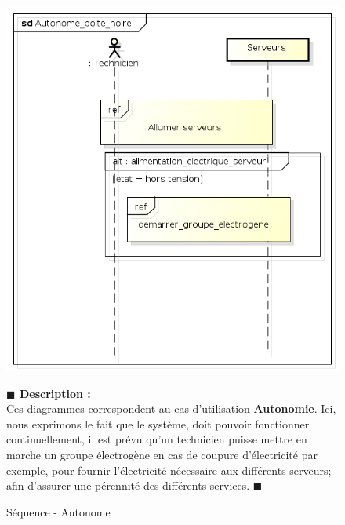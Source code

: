 \documentclass[11pt, titlepage]{report}
\newcommand{\debutDescription}{\noindent\textbf{\textcolor{DescriptionColor}{$\blacksquare$  Description : \\}}}
\newcommand{\finDescription}{\noindent\textcolor{DescriptionColor}{$\blacksquare$}}
\begin{document}
\begin{figure}[h!]
\begin{center}
\includegraphics[scale=.4]{../images/diagrammes/sysml/sequence/autonome_boite_noire.png} 
\caption{Séquence - Autonome}
\end{center}
\debutDescription
Ces diagrammes correspondent au cas d'utilisation \textbf{Autonomie}. Ici, nous exprimons le fait que le système, doit pouvoir fonctionner continuellement, il est prévu qu'un technicien puisse mettre en marche un groupe électrogène en cas de coupure d'électricité par exemple, pour fournir l'électricité nécessaire aux différents serveurs; afin d'assurer une pérennité des différents services.
\finDescription
\end{figure}

\clearpage
\end{document}
